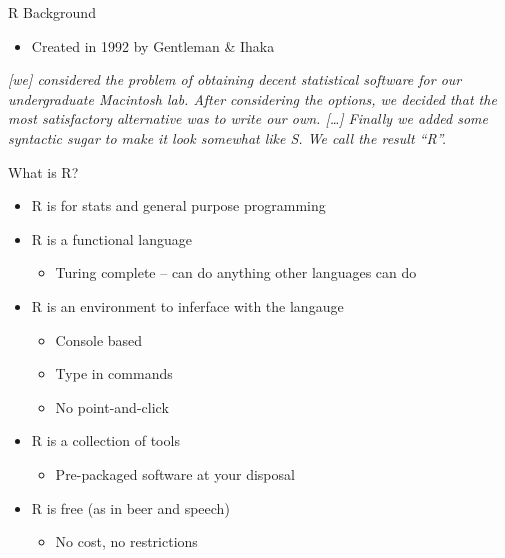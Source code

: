 \documentclass[
  ignorenonframetext,
]{beamer}
\providecommand{\tightlist}{%
  \setlength{\itemsep}{0pt}\setlength{\parskip}{0pt}}
\begin{document}
\begin{frame}{R Background}
\protect\hypertarget{r-background}{}

\begin{itemize}
\tightlist
\item
  Created in 1992 by Gentleman \& Ihaka
\end{itemize}

\emph{{[}we{]} considered the problem of obtaining decent statistical
software for our undergraduate Macintosh lab. After considering the
options, we decided that the most satisfactory alternative was to write
our own. {[}\ldots{}{]} Finally we added some syntactic sugar to make it
look somewhat like S. We call the result ``R''.}

\end{frame}

\begin{frame}{What is R?}
\protect\hypertarget{what-is-r}{}

\begin{itemize}
\tightlist
\item
  R is for stats and general purpose programming
\item
  R is a functional language

  \begin{itemize}
  \tightlist
  \item
    Turing complete -- can do anything other languages can do
  \end{itemize}
\item
  R is an environment to inferface with the langauge

  \begin{itemize}
  \tightlist
  \item
    Console based
  \item
    Type in commands
  \item
    No point-and-click
  \end{itemize}
\item
  R is a collection of tools

  \begin{itemize}
  \tightlist
  \item
    Pre-packaged software at your disposal
  \end{itemize}
\item
  R is free (as in beer and speech)

  \begin{itemize}
  \tightlist
  \item
    No cost, no restrictions
  \end{itemize}
\end{itemize}

\end{frame}
\end{document}
